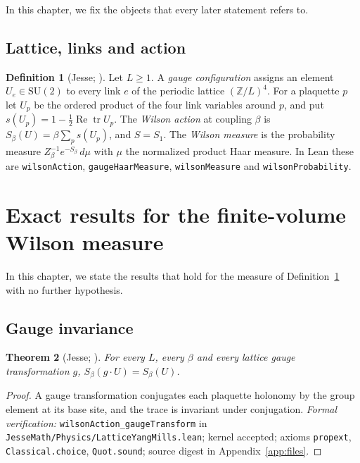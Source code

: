 \documentclass[11pt]{article}
\numberwithin{equation}{subsection}
\theoremstyle{plain}
\newtheorem{theorem}{Theorem}[subsection]
\theoremstyle{definition}
\newtheorem{definition}[theorem]{Definition}
\newcommand{\Z}{\mathbb{Z}}
\newcommand{\SU}{\mathrm{SU}}
\begin{document}
In this chapter, we fix the objects that every later statement refers to.

\subsection{Lattice, links and action}

\begin{definition}[Jesse; \cite{Wilson}]\label{def:wilson}
Let $L\ge 1$. A \emph{gauge configuration} assigns an element $U_e\in\SU(2)$ to every link $e$ of
the periodic lattice $(\Z/L)^4$. For a plaquette $p$ let $U_p$ be the ordered product of the four
link variables around $p$, and put $s(U_p)=1-\tfrac12\operatorname{Re}\operatorname{tr}U_p$. The
\emph{Wilson action} at coupling $\beta$ is $S_\beta(U)=\beta\sum_p s(U_p)$, and $S=S_1$. The
\emph{Wilson measure} is the probability measure $Z_\beta^{-1}e^{-S_\beta}\,d\mu$ with $\mu$ the
normalized product Haar measure. In Lean these are \texttt{wilson\allowbreak{}Action},
\texttt{gauge\allowbreak{}Haar\allowbreak{}Measure}, \texttt{wilson\allowbreak{}Measure} and \texttt{wilson\allowbreak{}Probability}.
\end{definition}

\section{Exact results for the finite-volume Wilson measure}\label{sec:wilson}

In this chapter, we state the results that hold for the measure of
Definition~\ref{def:wilson} with no further hypothesis.

\subsection{Gauge invariance}

\begin{theorem}[Jesse; \cite{Wilson}]\label{thm:gauge}
For every $L$, every $\beta$ and every lattice gauge transformation $g$, $S_\beta(g\cdot U)=S_\beta(U)$.
\end{theorem}
\begin{proof}
A gauge transformation conjugates each plaquette holonomy by the group element at its base
site, and the trace is invariant under conjugation. \emph{Formal verification:}
\texttt{wilson\allowbreak{}Action\_\allowbreak{}gauge\allowbreak{}Transform} in \texttt{Jesse\allowbreak{}Math/\allowbreak{}Physics/\allowbreak{}Lattice\allowbreak{}Yang\allowbreak{}Mills.\allowbreak{}lean}; kernel
accepted; axioms \texttt{propext}, \texttt{Classical.choice}, \texttt{Quot.sound}; source digest
in Appendix~\ref{app:files}.
\end{proof}
\end{document}
